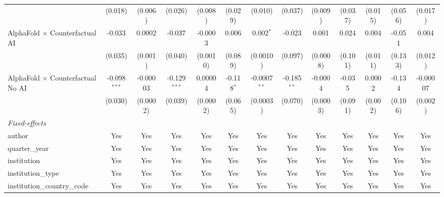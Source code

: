 \begin{tabular}{lcccccccccccc}
                                            & (0.018)        & (0.006)       & (0.026)        & (0.008)      & (0.029)      & (0.010)        & (0.037)       & (0.009)  & (0.037) & (0.015)      & (0.056) & (0.017)\\   
   AlphaFold $\times$ Counterfactual AI     & -0.033         & 0.0002        & -0.037         & -0.0003      & 0.006        & 0.002$^{*}$    & -0.023        & 0.001    & 0.024   & 0.004        & -0.051  & 0.004\\   
                                            & (0.035)        & (0.001)       & (0.040)        & (0.0010)     & (0.089)      & (0.0010)       & (0.097)       & (0.0008) & (0.101) & (0.011)      & (0.133) & (0.012)\\   
   AlphaFold $\times$ Counterfactual No AI  & -0.098$^{***}$ & -0.00003      & -0.129$^{***}$ & 0.00004      & -0.118$^{*}$ & -0.0007$^{**}$ & -0.185$^{**}$ & -0.0004  & -0.035  & 0.0002       & -0.134  & -0.00007\\   
                                            & (0.030)        & (0.0002)      & (0.039)        & (0.0002)     & (0.065)      & (0.0003)       & (0.070)       & (0.0003) & (0.091) & (0.002)      & (0.106) & (0.002)\\   
   \midrule
   \emph{Fixed-effects}\\
   author                                   & Yes            & Yes           & Yes            & Yes          & Yes          & Yes            & Yes           & Yes      & Yes     & Yes          & Yes     & Yes\\  
   quarter\_year                            & Yes            & Yes           & Yes            & Yes          & Yes          & Yes            & Yes           & Yes      & Yes     & Yes          & Yes     & Yes\\  
   institution                              & Yes            & Yes           & Yes            & Yes          & Yes          & Yes            & Yes           & Yes      & Yes     & Yes          & Yes     & Yes\\  
   institution\_type                        & Yes            & Yes           & Yes            & Yes          & Yes          & Yes            & Yes           & Yes      & Yes     & Yes          & Yes     & Yes\\  
   institution\_country\_code               & Yes            & Yes           & Yes            & Yes          & Yes          & Yes            & Yes           & Yes      & Yes     & Yes          & Yes     & Yes\\  

\end{tabular}
